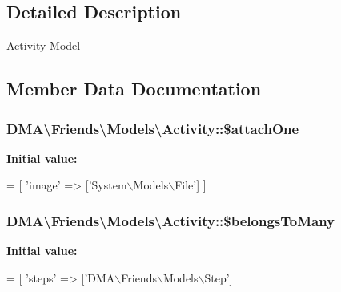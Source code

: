 \subsection{Detailed Description}
\hyperlink{classDMA_1_1Friends_1_1Models_1_1Activity}{Activity} Model 

\subsection{Member Data Documentation}
\hypertarget{classDMA_1_1Friends_1_1Models_1_1Activity_a9911cb733cbc863cc1bdccde254404b5}{
\subsubsection[{\$attach\-One}]{\setlength{\rightskip}{0pt plus 5cm}D\-M\-A\textbackslash{}\-Friends\textbackslash{}\-Models\textbackslash{}\-Activity\-::\$attach\-One}}\label{classDMA_1_1Friends_1_1Models_1_1Activity_a9911cb733cbc863cc1bdccde254404b5}
{\bfseries Initial value\-:}
\begin{DoxyCode}
= [
        \textcolor{stringliteral}{'image'} => [\textcolor{stringliteral}{'System\(\backslash\)Models\(\backslash\)File'}]
    ]
\end{DoxyCode}
\hypertarget{classDMA_1_1Friends_1_1Models_1_1Activity_ae5245e6eb74228cd54d8ae77e5a9bb38}{
\subsubsection[{\$belongs\-To\-Many}]{\setlength{\rightskip}{0pt plus 5cm}D\-M\-A\textbackslash{}\-Friends\textbackslash{}\-Models\textbackslash{}\-Activity\-::\$belongs\-To\-Many}}\label{classDMA_1_1Friends_1_1Models_1_1Activity_ae5245e6eb74228cd54d8ae77e5a9bb38}
{\bfseries Initial value\-:}
\begin{DoxyCode}
= [
        \textcolor{stringliteral}{'steps'}         => [\textcolor{stringliteral}{'DMA\(\backslash\)Friends\(\backslash\)Models\(\backslash\)Step'}]
\end{DoxyCode}
